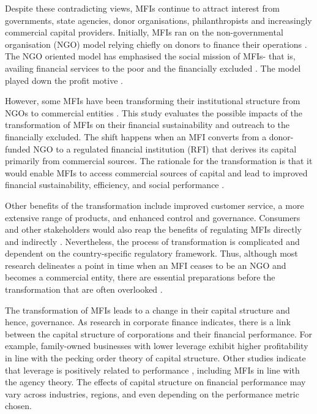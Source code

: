 \documentclass[a4paper, nobind]{templates/ociamthesis}
\begin{document}
Despite these contradicting views, MFIs continue to attract interest from governments, state agencies, donor organisations, philanthropists and increasingly commercial capital providers. Initially, MFIs ran on the non-governmental organisation (NGO) model relying chiefly on donors to finance their operations \autocite{d2017ngos}. The NGO oriented model has emphasised the social mission of MFIs- that is, availing financial services to the poor and the financially excluded \autocite{ashta2012compartamos}. The model played down the profit motive \autocite{ashta2012compartamos}.

However, some MFIs have been transforming their institutional structure from NGOs to commercial entities \autocite{d2017ngos}. This study evaluates the possible impacts of the transformation of MFIs on their financial sustainability and outreach to the financially excluded. The shift happens when an MFI converts from a donor-funded NGO to a regulated financial institution (RFI) that derives its capital primarily from commercial sources. The rationale for the transformation is that it would enable MFIs to access commercial sources of capital and lead to improved financial sustainability, efficiency, and social performance \autocite{louis2013financial}.

Other benefits of the transformation include improved customer service, a more extensive range of products, and enhanced control and governance\autocite{srnec2008transformation}. Consumers and other stakeholders would also reap the benefits of regulating MFIs directly \autocite{meagher2006microfinance} and indirectly \autocite{hartarska2007regulated}. Nevertheless, the process of transformation is complicated and dependent on the country-specific regulatory framework. Thus, although most research delineates a point in time when an MFI ceases to be an NGO and becomes a commercial entity, there are essential preparations before the transformation that are often overlooked \autocite{d2017ngos}.

The transformation of MFIs leads to a change in their capital structure and hence, governance. As research in corporate finance indicates, there is a link between the capital structure of corporations and their financial performance. For example, family-owned businesses with lower leverage exhibit higher profitability \autocite{hamid2015capital} in line with the pecking order theory of capital structure. Other studies indicate that leverage is positively related to performance \autocite{fosu2013capital,berger2006capital}, including MFIs \autocite{kar2012does} in line with the agency theory. The effects of capital structure on financial performance may vary across industries, regions, and even depending on the performance metric chosen.
\end{document}

